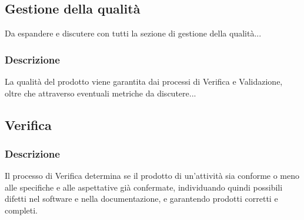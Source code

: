   \subsection{Gestione della qualità}
    Da espandere e discutere con tutti la sezione di gestione della qualità...
    \subsubsection{Descrizione}
      La qualità del prodotto viene garantita dai processi di Verifica e Validazione, oltre che attraverso eventuali metriche da discutere...

  \subsection{Verifica}
    \subsubsection{Descrizione}
      Il processo di Verifica determina se il prodotto di un'attività sia conforme o meno alle specifiche e alle aspettative già confermate, individuando quindi possibili difetti nel software e nella documentazione, e garantendo prodotti corretti e completi.

